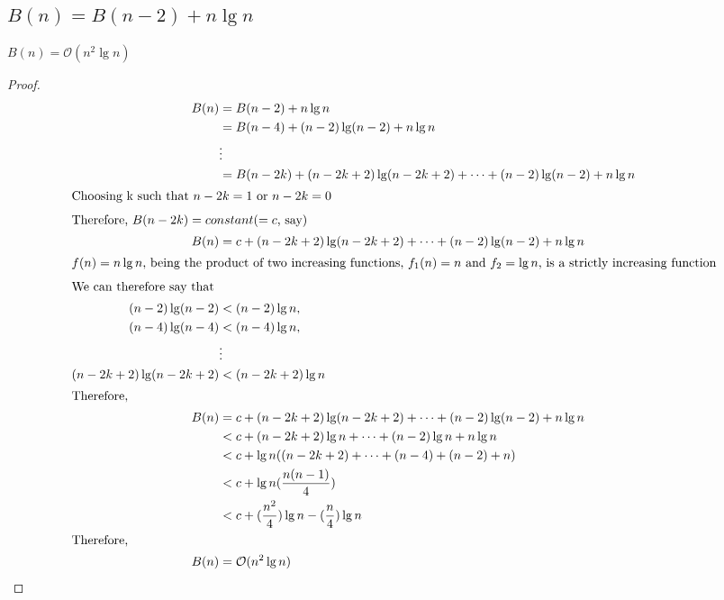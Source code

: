 \documentclass{article}
\begin{document}
\subsection{$B(n) = B(n-2) + n\lg n$}
$B(n) = \mathcal{O}(n^2\lg n)$
\begin{proof}

\begin{align*}
B(n) & = B(n-2) + n\lg n \\
& = B(n-4) + (n-2)\lg(n-2) + n\lg n \\
& \vdots \\
& = B(n-2k) + (n-2k+2)\lg(n-2k+2)+ \cdots + (n-2)\lg(n-2) + n\lg n \\
\intertext{Choosing k such that $n - 2k = 1$ or $ n - 2k = 0$}
\intertext{Therefore, $B(n-2k) = constant$($= c$, say)}
B(n) & = c + (n-2k+2)\lg(n-2k+2)+ \cdots + (n-2)\lg(n-2) + n\lg n \\
\intertext{$f(n) = n\lg n$, being the product of two increasing functions, $f_1(n) = n$ and $f_2 = \lg n$, is a strictly increasing function}
\intertext {We can therefore say that }
(n-2)\lg(n-2) & < (n-2)\lg n, \\
(n-4)\lg(n-4) & < (n-4)\lg n, \\
&\vdots \\
(n-2k+2)\lg(n-2k+2) & < (n-2k+2)\lg n \\
\intertext{Therefore, }
B(n) & = c + (n-2k+2)\lg(n-2k+2)+ \cdots + (n-2)\lg(n-2) + n\lg n \\
& < c + (n-2k+2)\lg n+ \cdots + (n-2)\lg n + n\lg n \\
& < c + \lg n((n-2k+2) + \dots + (n-4) + (n-2) + n) \\
& < c + \lg n(\frac{n(n-1)}{4}) \\
& < c + (\frac{n^2}{4})\lg n - (\frac{n}{4})\lg n \\
\intertext{Therefore, }
B(n) & = \mathcal{O}(n^2\lg n)
\end{align*}

\end{proof}

\newpage
\end{document}
